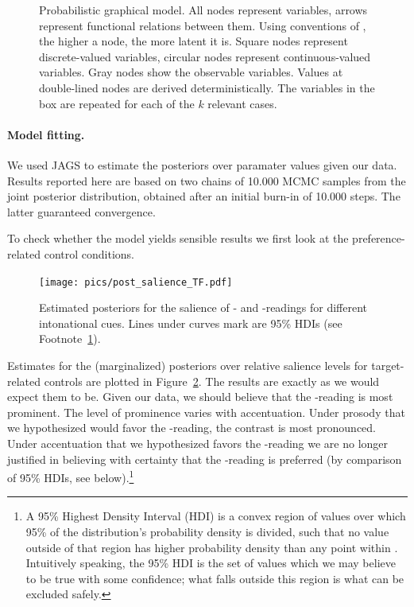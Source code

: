 \documentclass[fleqn,reqno,10pt,draft]{article}
\newcommand{\lc}{\acro{lc}}
\newcommand{\ec}{\acro{ec}}
\begin{document}
\begin{figure}[]
  \caption{Probabilistic graphical model. All nodes represent
    variables, arrows represent functional relations between them.
    Using conventions of \citet{LeeWagenmakers2013:Bayesian-Cognit},
    the higher a node, the more latent it is. Square nodes represent
    discrete-valued variables, circular nodes represent
    continuous-valued variables. Gray nodes show the observable
    variables. Values at double-lined nodes are derived
    deterministically. The variables in the box are repeated for each
    of the $k$ relevant cases.}
  \label{fig:model_graph}
\end{figure}

\paragraph{Model fitting.} We used JAGS
\citep{Plummer2003:JAGS:-A-Program} to estimate the posteriors over
paramater values given our data. Results reported here are based on
two chains of 10.000 MCMC samples from the joint posterior
distribution, obtained after an initial burn-in of 10.000 steps. The
latter guaranteed convergence.

To check whether the model yields sensible results we first look at
the preference-related control conditions.
%
\begin{figure}
  \centering
  \texttt{[image: pics/post\_salience\_TF.pdf]}
  \caption{Estimated posteriors for the salience of \lc- and
    \ec-readings for different intonational cues. Lines under curves
    mark are 95\% HDIs (see Footnote~\ref{fn:HDI}).}
  \label{fig:Posterior_TF}
\end{figure}
%
Estimates for the (marginalized) posteriors over relative salience
levels for target-related controls are plotted in
Figure~\ref{fig:Posterior_TF}. The results are exactly as we would
expect them to be. Given our data, we should believe that the
\lc-reading is most prominent. The level of prominence varies with
accentuation. Under prosody that we hypothesized would favor the
\lc-reading, the contrast is most pronounced. Under accentuation that
we hypothesized favors the \ec-reading we are no longer justified in
believing with certainty that the \lc-reading is preferred (by
comparison of 95\% HDIs, see below).\footnote{\label{fn:HDI} A 95\%
  Highest Density Interval (HDI) is a convex region of values over
  which 95\% of the distribution's probability density is divided,
  such that no value outside of that region has higher probability
  density than any point within
  \citep{Kruschke2011:Doing-Bayesian-}. Intuitively speaking, the 95\%
  HDI is the set of values which we may believe to be true with some
  confidence; what falls outside this region is what can be excluded
  safely.}
\end{document}
